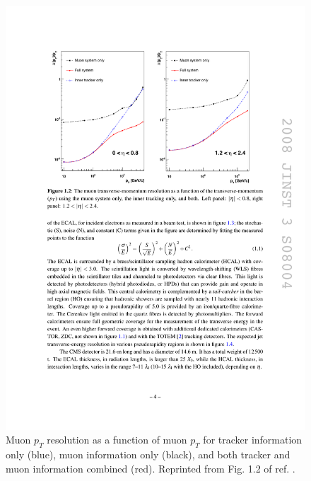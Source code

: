 \documentclass[dissertation.tex]{subfiles}
\begin{document}
\begin{figure}
	\centering
	\includegraphics[scale=1.0]{muon_pT_res}
	\caption{Muon $p_{T}$ resolution as a function of muon $p_{T}$ for tracker information only (blue), muon information only (black), and both tracker and muon information combined (red).  Reprinted from Fig. 1.2 of ref. \cite{1748-0221-3-08-S08004}.}
	\label{fig:muon_pT_res}
\end{figure}
\end{document}
